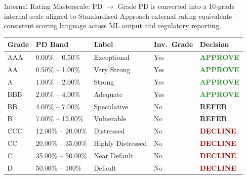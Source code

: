 \documentclass[9pt,aspectratio=169]{beamer}
\begin{document}
\begin{frame}{Internal Rating Masterscale: PD $\to$ Grade}
\vspace{-2pt}
{\footnotesize PD is converted into a 10-grade internal scale aligned to Standardised-Approach
external rating equivalents --- consistent scoring language across ML output and regulatory reporting.}\\[6pt]
\begin{center}
\footnotesize
\begin{tabular}{lllll}
  \toprule
  \textbf{Grade} & \textbf{PD Band} & \textbf{Label} & \textbf{Inv.\ Grade} & \textbf{Decision}\\
  \midrule
  AAA & 0.00\% -- 0.50\%   & Exceptional        & Yes & \textcolor{forestgreen}{\textbf{APPROVE}}\\
  AA  & 0.50\% -- 1.00\%   & Very Strong        & Yes & \textcolor{forestgreen}{\textbf{APPROVE}}\\
  A   & 1.00\% -- 2.00\%   & Strong             & Yes & \textcolor{forestgreen}{\textbf{APPROVE}}\\
  BBB & 2.00\% -- 4.00\%   & Adequate           & Yes & \textcolor{forestgreen}{\textbf{APPROVE}}\\
  BB  & 4.00\% -- 7.00\%   & Speculative        & No  & \textcolor{amberc}{\textbf{REFER}}\\
  B   & 7.00\% -- 12.00\%  & Vulnerable         & No  & \textcolor{amberc}{\textbf{REFER}}\\
  CCC & 12.00\% -- 20.00\% & Distressed         & No  & \textcolor{darkred}{\textbf{DECLINE}}\\
  CC  & 20.00\% -- 35.00\% & Highly Distressed  & No  & \textcolor{darkred}{\textbf{DECLINE}}\\
  C   & 35.00\% -- 50.00\% & Near Default       & No  & \textcolor{darkred}{\textbf{DECLINE}}\\
  D   & 50.00\% -- 100\%   & Default            & No  & \textcolor{darkred}{\textbf{DECLINE}}\\
  \bottomrule
\end{tabular}
\end{center}
\end{frame}
\end{document}
